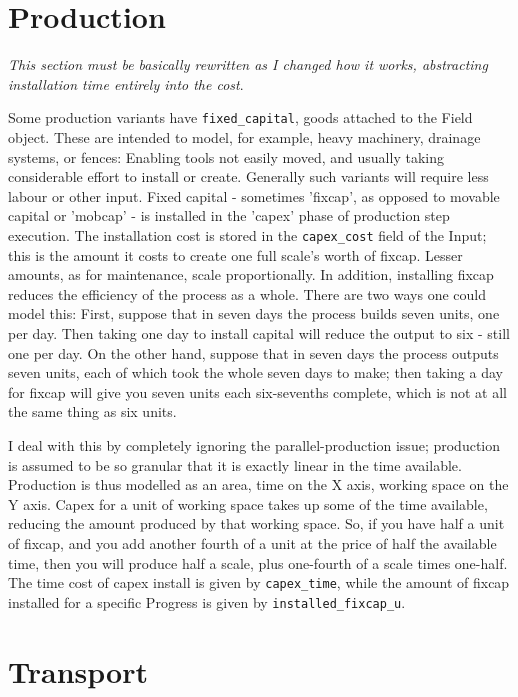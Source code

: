 \documentclass[12pt]{book}
\begin{document}
\chapter{Production}

\emph{This section must be basically rewritten as I changed how it
  works, abstracting installation time entirely into the cost}.

Some production variants have \verb|fixed_capital|, goods attached to the
Field object. These are intended to model, for example, heavy
machinery, drainage systems, or fences: Enabling tools not easily
moved, and usually taking considerable effort to install or
create. Generally such variants will require less labour or other
input. Fixed capital - sometimes 'fixcap', as opposed to movable
capital or 'mobcap' - is installed in the 'capex' phase of production
step execution. The installation cost is stored in the
\verb|capex_cost| field of the Input; this is the amount it costs to
create one full scale's worth of fixcap. Lesser amounts, as for
maintenance, scale proportionally. In addition, installing fixcap
reduces the efficiency of the process as a whole. There are two ways
one could model this: First, suppose that in seven days the process
builds seven units, one per day. Then taking one day to install
capital will reduce the output to six - still one per day. On the
other hand, suppose that in seven days the process outputs seven
units, each of which took the whole seven days to make; then taking a
day for fixcap will give you seven units each six-sevenths complete,
which is not at all the same thing as six units. 

I deal with this by completely ignoring the parallel-production issue;
production is assumed to be so granular that it is exactly linear in
the time available. Production is thus modelled as an area, time on
the X axis, working space on the Y axis. Capex for a unit of working
space takes up some of the time available, reducing the amount
produced by that working space. So, if you have half a unit of fixcap,
and you add another fourth of a unit at the price of half the
available time, then you will produce half a scale, plus one-fourth of
a scale times one-half. The time cost of capex install is given by 
\verb|capex_time|, while the amount of fixcap installed for a specific
Progress is given by \verb|installed_fixcap_u|.

\chapter{Transport}
\end{document}
